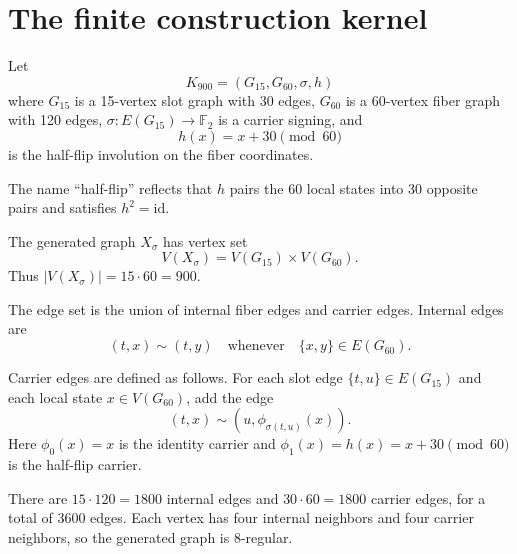 \section{The finite construction kernel}

\begin{definition}
Let
\[
K_{900}=(G_{15},G_{60},\sigma,h)
\]
where \(G_{15}\) is a 15-vertex slot graph with 30 edges, \(G_{60}\) is a 60-vertex fiber graph with 120 edges, \(\sigma:E(G_{15})\to \mathbb F_2\) is a carrier signing, and
\[
h(x)=x+30 \pmod{60}
\]
is the half-flip involution on the fiber coordinates.
\end{definition}

The name ``half-flip'' reflects that \(h\) pairs the 60 local states into 30 opposite pairs and satisfies \(h^2=\mathrm{id}\).

The generated graph \(X_\sigma\) has vertex set
\[
V(X_\sigma)=V(G_{15})\times V(G_{60}).
\]
Thus \(|V(X_\sigma)|=15\cdot 60=900\).

The edge set is the union of internal fiber edges and carrier edges. Internal edges are
\[
(t,x)\sim(t,y)
\quad\text{whenever}\quad
\{x,y\}\in E(G_{60}).
\]

Carrier edges are defined as follows. For each slot edge \(\{t,u\}\in E(G_{15})\) and each local state \(x\in V(G_{60})\), add the edge
\[
(t,x)\sim (u,\phi_{\sigma(t,u)}(x)).
\]
Here \(\phi_0(x)=x\) is the identity carrier and \(\phi_1(x)=h(x)=x+30 \pmod{60}\) is the half-flip carrier.

There are \(15\cdot 120=1800\) internal edges and \(30\cdot 60=1800\) carrier edges, for a total of 3600 edges. Each vertex has four internal neighbors and four carrier neighbors, so the generated graph is 8-regular.

